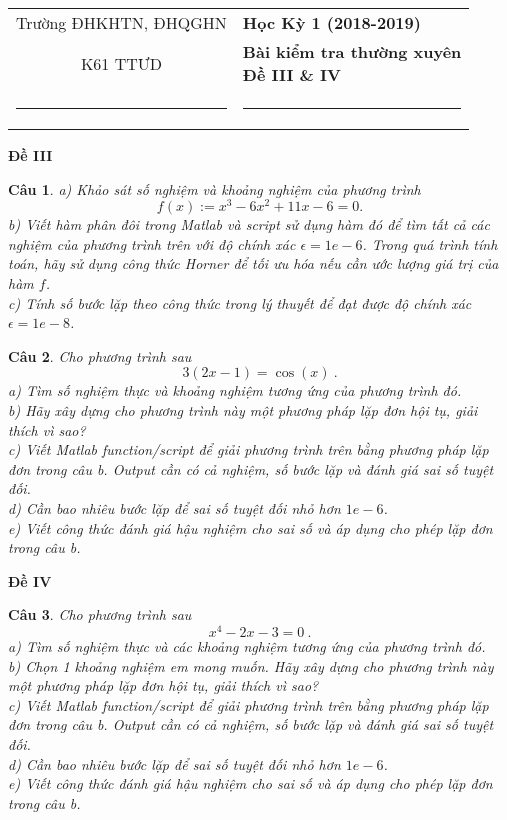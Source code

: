 \documentclass[11pt]{article}
\newtheorem{bt}{Câu}
\begin{document}
\begin{tabular*}
{\linewidth}{c>{\centering\hspace{0pt}} p{}}
Trường ĐHKHTN, ĐHQGHN & {\bf Học Kỳ 1 (2018-2019)}
\tabularnewline
K61 TTƯD & {\bf Bài kiểm tra thường xuyên \\ Đề III \& IV}
\tabularnewline
\rule{1in}{1pt}  \small  & \rule{2in}{1pt} %
\tabularnewline

\end{tabular*}
%

\begin{center}	
	\textbf{Đề III}
\end{center}

\begin{bt}
a) Khảo sát số nghiệm và khoảng nghiệm của phương trình 
%
\[ f(x) := x^3 - 6x^2 + 11x - 6 = 0.  \] 
%
b) Viết hàm phân đôi trong Matlab và script sử dụng hàm đó để tìm tất cả các nghiệm của phương trình trên với độ chính xác $\epsilon=1e-6$.	
Trong quá trình tính toán, hãy sử dụng công thức Horner để tối ưu hóa nếu cần ước lượng giá trị của hàm $f$.\\
c) Tính số bước lặp theo công thức trong lý thuyết để đạt được độ chính xác $\epsilon=1e-8$.
\end{bt}

\begin{bt}
Cho phương trình sau
%
\[ 3(2x-1)= \cos(x) \ .\]
%
a) Tìm số nghiệm thực và khoảng nghiệm tương ứng của phương trình đó. \\
b) Hãy xây dựng cho phương trình này một phương pháp lặp đơn hội tụ, giải thích vì sao? \\
c) Viết Matlab function/script để giải phương trình trên bằng phương pháp lặp đơn trong câu b. Output cần có cả nghiệm, số bước lặp và đánh giá sai số tuyệt đối. \\
d) Cần bao nhiêu bước lặp để sai số tuyệt đối nhỏ hơn $1e-6$. \\
e) Viết công thức đánh giá hậu nghiệm cho sai số và áp dụng cho phép lặp đơn trong câu b.
\end{bt}

\begin{center}	
	\textbf{Đề IV}
\end{center}

\begin{bt}
Cho phương trình sau
%
\[ x^4-2x-3=0  \ . \]
%
a) Tìm số nghiệm thực và các khoảng nghiệm tương ứng của phương trình đó. \\
b) Chọn 1 khoảng nghiệm em mong muốn. Hãy xây dựng cho phương trình này một phương pháp lặp đơn hội tụ, giải thích vì sao? \\
c) Viết Matlab function/script để giải phương trình trên bằng phương pháp lặp đơn trong câu b. Output cần có cả nghiệm, số bước lặp và đánh giá sai số tuyệt đối. \\
d) Cần bao nhiêu bước lặp để sai số tuyệt đối nhỏ hơn $1e-6$. \\
e) Viết công thức đánh giá hậu nghiệm cho sai số và áp dụng cho phép lặp đơn trong câu b.
\end{bt}
\end{document}
